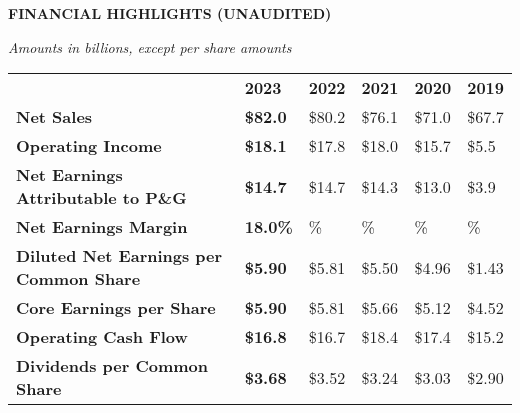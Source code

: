 \documentclass{article}
\begin{document}
\begin{center}
\setlength{\tabcolsep}{8pt}
\renewcommand{\arraystretch}{1.6}

{\LARGE \textbf{FINANCIAL HIGHLIGHTS (UNAUDITED)}}

\smallskip
\textit{Amounts in billions, except per share amounts}

\vspace{0.5em}

\begin{tabular}{
    >{\raggedright\arraybackslash}p{4.2cm} 
    >{\centering\arraybackslash}p{1.7cm}
    >{\centering\arraybackslash}p{1.7cm}
    >{\centering\arraybackslash}p{1.7cm}
    >{\centering\arraybackslash}p{1.7cm}
    >{\centering\arraybackslash}p{1.7cm}
}
\rowcolor{headerblue}
\textbf{} & \textbf{2023} & \textbf{2022} & \textbf{2021} & \textbf{2020} & \textbf{2019} \\
\arrayrulecolor{lightblue}\midrule
\textbf{Net Sales} & \textbf{\$82.0} & \$80.2 & \$76.1 & \$71.0 & \$67.7 \\
\midrule
\textbf{Operating Income} & \textbf{\$18.1} & \$17.8 & \$18.0 & \$15.7 & \$5.5 \\
\midrule
\textbf{Net Earnings Attributable to P\&G} & \textbf{\$14.7} & \$14.7 & \$14.3 & \$13.0 & \$3.9 \\
\midrule
\textbf{Net Earnings Margin} & \textbf{18.0\%} & 18.4\% & 18.9\% & 18.5\% & 5.9\% \\
\midrule
\textbf{Diluted Net Earnings per Common Share} & \textbf{\$5.90} & \$5.81 & \$5.50 & \$4.96 & \$1.43 \\
\midrule
\textbf{Core Earnings per Share} & \textbf{\$5.90} & \$5.81 & \$5.66 & \$5.12 & \$4.52 \\
\midrule
\textbf{Operating Cash Flow} & \textbf{\$16.8} & \$16.7 & \$18.4 & \$17.4 & \$15.2 \\
\midrule
\textbf{Dividends per Common Share} & \textbf{\$3.68} & \$3.52 & \$3.24 & \$3.03 & \$2.90 \\
\end{tabular}
\end{center}
\end{document}
